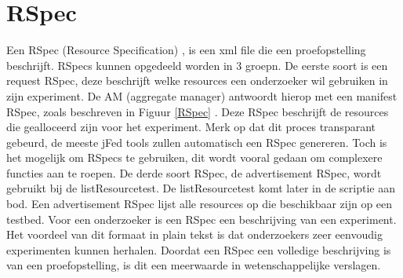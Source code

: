 \section{RSpec}
\npar
Een RSpec (Resource Specification) , is een xml file die een proefopstelling beschrijft\citep{geni-RSpec}. 
RSpecs kunnen opgedeeld worden in 3 groepn. De eerste soort is een request RSpec, deze beschrijft welke resources een onderzoeker wil gebruiken in zijn experiment. De AM (aggregate manager) antwoordt hierop met een manifest RSpec, zoals beschreven in Figuur \ref{RSpec} . Deze RSpec beschrijft de resources die gealloceerd zijn voor het experiment. Merk op dat dit proces transparant gebeurd, de meeste jFed tools zullen automatisch een RSpec genereren. Toch is het mogelijk om RSpecs te gebruiken, dit wordt vooral gedaan om complexere functies aan te roepen.
\clearpage
\npar
De derde soort RSpec, de advertisement RSpec, wordt gebruikt bij de listResourcetest. De listResourcetest komt later in de scriptie aan bod. Een advertisement RSpec lijst alle resources op die beschikbaar zijn op een testbed.
\npar
Voor een onderzoeker is een RSpec een beschrijving van een experiment. Het voordeel van dit formaat in plain tekst is dat onderzoekers zeer eenvoudig experimenten kunnen herhalen. Doordat een RSpec een volledige beschrijving is van een proefopstelling, is dit een meerwaarde in wetenschappelijke verslagen.
